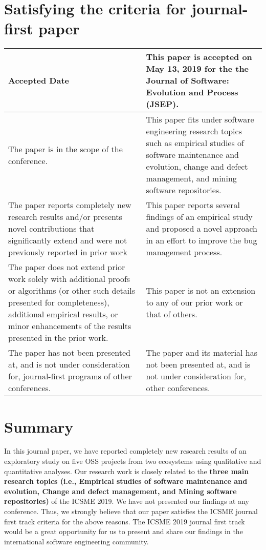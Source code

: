 \documentclass[conference]{IEEEtran}
\begin{document}
\section{Satisfying the criteria for journal-first paper}
\begin{table}[h]
\label{table:statBR}
\begin{center}
\begin{tabular}{ |p{3.9cm}|p{3.9cm}|}
\hline
Accepted Date& This paper is accepted on May 13, 2019 for the the Journal of Software: Evolution and Process (JSEP).\\ \hline
The paper is in the scope of the
conference.& This paper fits under software engineering research topics such as empirical studies of software maintenance and evolution, change and defect management, and mining software repositories.\\ \hline
The paper reports completely new research results and/or presents
novel contributions that significantly extend and were not previously
reported in prior work & This paper reports several findings of an empirical study and proposed a novel approach in an effort to improve the bug management process.\\ \hline
The paper does not extend prior work solely with additional proofs or algorithms (or other such details presented for completeness), additional
empirical results, or minor enhancements of the results presented in the prior work.& This paper is not an extension to any of our prior work or that of others. \\ \hline
The paper has not been presented at, and is not under consideration
for, journal-first programs of other conferences.& The paper and its material has not been presented at, and is not under consideration for, other conferences. \\ \hline
\end{tabular}
\end{center}
\end{table} 
\section{Summary}
In this journal paper, we have reported completely new research results of an exploratory study on five OSS projects from two ecosystems using qualitative and quantitative analyses. Our research work is closely related to the \textbf{three main research topics (i.e., Empirical studies of software maintenance and evolution, Change and defect management, and Mining software repositories)} of the ICSME 2019. We have not presented our findings at any conference. Thus, we strongly believe that our paper satisfies the ICSME journal first track criteria for the above reasons. The ICSME 2019 journal first track would be a great opportunity for us to present and share our findings in the international software engineering community.


\end{document}
